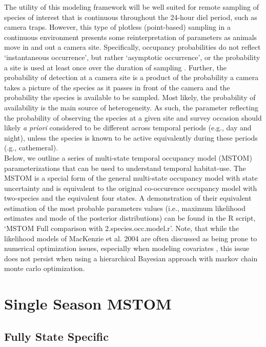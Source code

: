 \documentclass[12pt]{article}
\begin{document}
The utility of this modeling framework will be well suited for remote sampling of species of interest that is continuous throughout the 24-hour diel period, such as camera traps. However, this type of plotless (point-based) sampling in a continuous environment presents some reinterpretation of parameters as animals move in and out a camera site. Specifically, occupancy probabilities do not reflect `instantaneous occurrence', but rather `asymptotic occurrence', or the probability a site is used at least once over the duration of sampling \citep{efford2012}. Further, the probability of detection at a camera site is a product of the probability a camera takes a picture of the species as it passes in front of the camera and the probability the species is available to be sampled. Most likely, the probability of availability is the main source of heterogeneity. As such, the parameter reflecting the probability of observing the species at a given site and survey occasion should likely \emph{a priori} considered to be different across temporal periods (e.g., day and night), unless the species is known to be active equivalently during these periods (\emph{}.g., cathemeral).\\

Below, we outline a series of multi-state temporal occupancy model (MSTOM) parameterizations that can be used to understand temporal habitat-use. The MSTOM is a special form of the general multi-state occupancy model with state uncertainty \citep{MacKenzie2009} and is equivalent to the original co-occurence occupancy model \citep{MacKenzie2004} with two-species and the equivalent four states. A demonstration of their equivalent estimation of the most probable parameters values (i.e., maximum likelihood estimates and mode of the posterior distributions) can be found in the R script, `MSTOM Full comparison with 2.species.occ.model.r'. Note, that while the likelihood models of MacKenzie et al. 2004 are often discussed as being prone to numerical optimization issues, especially when modeling covariates \citep{MacKenzie2004}, this issue does not persist when using a hierarchical Bayesian approach with markov chain monte carlo optimization.



\section{Single Season MSTOM}
\subsection{Fully State Specific}
\end{document}
